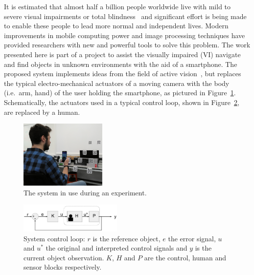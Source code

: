 \documentclass[a4paper, twoside]{article}
\begin{document}
\noindent It is estimated that almost half a billion people worldwide live with mild to severe visual impairments or total blindness~\cite{bourne2017magnitude} and significant effort is being made to enable these people to lead more normal and independent lives. Modern improvements in mobile computing power and image processing techniques have provided researchers with new and powerful tools to solve this problem. The work presented here is part of a project to assist the visually impaired (VI) navigate and find objects in unknown environments with the aid of a smartphone. The proposed system implements ideas from the field of active vision~\cite{Bajcsy2017,bellotto2013}, but replaces the typical electro-mechanical actuators of a moving camera with the body (i.e.\ arm, hand) of the user holding the smartphone, as pictured in Figure~\ref{fig:system-use}. Schematically, the actuators used in a typical control loop, shown in Figure~\ref{fig:control-loop}, are replaced by a human. %

\begin{figure}
  \centering
  \includegraphics[width=0.38\textwidth]{figures/system_use.png}
  \caption{The system in use during an experiment. }\label{fig:system-use}
\end{figure}

\begin{figure}
  \centering
  \includegraphics[width=0.45\textwidth]{figures/control_loop.png}
  \caption{System control loop: $r$ is the reference object, $e$ the error signal, $u$ and $u^*$ the original and interpreted control signals and $y$ is the current object observation. $K$, $H$ and $P$ are the control, human and sensor blocks respectively. }\label{fig:control-loop}
\end{figure}
\end{document}
